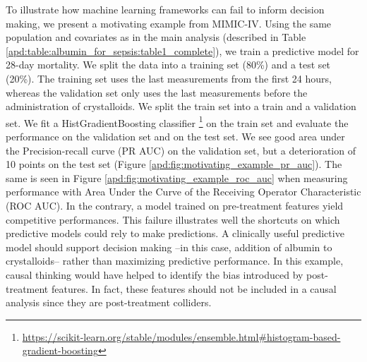 \documentclass[french,12pt,twoside,a4paper]{book}
\begin{document}
\begin{appendices}
  To illustrate how machine learning frameworks can fail to inform decision
  making, we present a motivating example from MIMIC-IV. Using the same
  population and covariates as in the main analysis (described in Table
  \ref{apd:table:albumin_for_sepsis:table1_complete}), we train a predictive
  model for 28-day mortality. We split the data into a training set (80\%) and a
  test set (20\%). The training set uses the last measurements from the first 24
  hours, whereas the validation set only uses the last measurements before the
  administration of crystalloids. We split the train set into a train and a
  validation set. We fit a HistGradientBoosting classifier
  \footnote{\url{https://scikit-learn.org/stable/modules/ensemble.html\#histogram-based-gradient-boosting}}
  on the train set and evaluate the performance on the validation set and on the
  test set. We see good area under the Precision-recall curve (PR AUC) on the
  validation set, but a deterioration of 10 points on the test set (Figure
  \ref{apd:fig:motivating_example_pr_auc}). The same is seen in Figure
  \ref{apd:fig:motivating_example_roc_auc} when measuring performance with Area
  Under the Curve of the Receiving Operator Characteristic (ROC AUC). In the
  contrary, a model trained on pre-treatment features yield competitive
  performances. This failure illustrates well the shortcuts on which predictive
  models could rely to make predictions. A clinically useful predictive model
  should support decision making --in this case, addition of albumin to
  crystalloids-- rather than maximizing predictive performance. In this example,
  causal thinking would have helped to identify the bias introduced by
  post-treatment features. In fact, these features should not be included in a
  causal analysis since they are post-treatment colliders.


\end{appendices}
\end{document}
